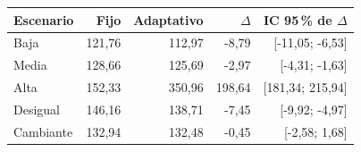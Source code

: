 \begin{tabular}{lrrrr}\toprule
Escenario & Fijo & Adaptativo & $\Delta$ & IC 95\,\% de $\Delta$\\\midrule
Baja & 121,76 & 112,97 & -8,79 & [-11,05; -6,53]\\
Media & 128,66 & 125,69 & -2,97 & [-4,31; -1,63]\\
Alta & 152,33 & 350,96 & 198,64 & [181,34; 215,94]\\
Desigual & 146,16 & 138,71 & -7,45 & [-9,92; -4,97]\\
Cambiante & 132,94 & 132,48 & -0,45 & [-2,58; 1,68]\\
\bottomrule\end{tabular}

